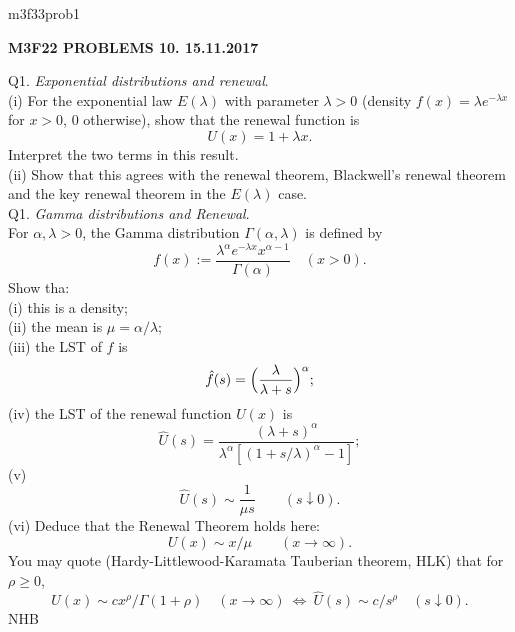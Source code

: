 \documentclass[12pt]{article}
\begin{document}
\def\R{\mathbb{R}}
\def\C{\mathbb{C}}
\def\Z{\mathbb{Z}}
\def\N{\mathbb{N}}
\def\Q{\mathbb{Q}}
\def\D{\mathbb{D}}
\def\Sp{{\mathbb{S}}}
\def\T{\mathbb{T}}
\def\H{\mathbb{H}}
\def\hb{\hfil \break}
\def\ni{\noindent}
\def\i{\indent}
\def\a{\alpha}
\def\b{\beta}
\def\e{\epsilon}
\def\d{\delta}
\def\D{\Delta}
\def\G{\Gamma}
\def\g{\gamma}
\def\l{\lambda}
\def\m{\mu}
\def\s{\sigma}
\def\Si{\Sigma}
\def\th{\theta}
\def\z{\zeta}
\def\p{\partial}
\def\o{\omega}
\def\O{\Omega}
\def\t{\tau}
\def\L{\it \char'44}
\def\F{\mathcal{F}}
\def\B{\mathcal{B}}
\def\C{\mathcal{C}}
\def\half{\frac{1}{2}}
\ni m3f33prob1 \\
\begin{center}
{\bf M3F22 PROBLEMS 10.  15.11.2017} 
\end{center}

\ni Q1.  {\it Exponential distributions and renewal}. \\
(i) For the exponential law $E(\l)$ with parameter $\l > 0$ (density $f(x) = \l e^{-\l x}$ for $x > 0$, 0 otherwise), show that the renewal function is
$$
U(x) = 1 + \l x.
$$
Interpret the two terms in this result. \\
(ii) Show that this agrees with the renewal theorem, Blackwell's renewal theorem  and the key renewal theorem in the $E(\l)$ case. \\

\ni Q1.  {\it Gamma distributions and Renewal}. \\
\i For $\a, \l > 0$, the Gamma distribution $\G(\a, \l)$ is defined by
$$
f(x) := \frac{{\l}^{\a} e^{-\l x} x^{\a - 1}}{\G(\a)} \quad (x > 0).
$$
Show tha: \\
(i) this is a density; \\
(ii) the mean is $\mu = \a/\l$; \\
(iii) the LST of $f$ is
$$
\hat f(s) = \Bigl( \frac{\l}{\l + s} \Bigr)^{\a};
$$
(iv) the LST of the renewal function $U(x)$ is
$$
\hat U(s) = \frac{(\l + s)^{\a}}{{\l}^{\a}[(1 + s/\l)^{\a} - 1]};
$$
(v)
$$\hat U(s) \sim \frac{1}{\mu s}\qquad (s \downarrow 0).
$$
(vi) Deduce that the Renewal Theorem holds here:
$$
U(x) \sim x/\mu \qquad (x \to \infty).
$$
You may quote (Hardy-Littlewood-Karamata Tauberian theorem, HLK) that for $\rho \geq 0$,
$$
U(x) \sim c x^{\rho}/\G(1+\rho) \quad (x \to \infty) \ \Leftrightarrow \ \hat U(s) \sim c/s^{\rho} \quad (s \downarrow 0).
$$
\hfil NHB \break
\end{document}
